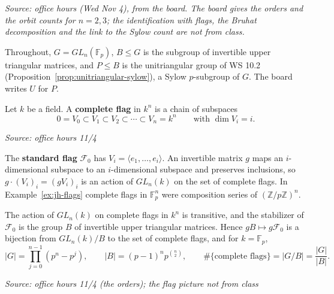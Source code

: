 \documentclass[11pt]{report}
\newcommand{\srcline}[1]{\par\hfill{\footnotesize\textit{Source: #1}}}
\begin{document}
\textit{Source: office hours (Wed Nov 4), from the board. The board gives the orders and the orbit counts for $n = 2, 3$; the identification with flags, the Bruhat decomposition and the link to the Sylow count are not from class.}

Throughout, $G = GL_n(\mathbb{F}_p)$, $B \leq G$ is the subgroup of invertible upper triangular matrices, and $P \leq B$ is the unitriangular group of WS 10.2 (Proposition~\ref{prop:unitriangular-sylow}), a Sylow $p$-subgroup of $G$. The board writes $U$ for $P$.

\begin{defbox}\label{def:complete-flag}
Let $k$ be a field. A \textbf{complete flag} in $k^n$ is a chain of subspaces
\[ 0 = V_0 \subset V_1 \subset V_2 \subset \cdots \subset V_n = k^n \qquad \text{with } \dim V_i = i. \]
\srcline{office hours 11/4}
\end{defbox}

The \textbf{standard flag} $\mathcal{F}_0$ has $V_i = \langle e_1, \ldots, e_i \rangle$. An invertible matrix $g$ maps an $i$-dimensional subspace to an $i$-dimensional subspace and preserves inclusions, so $g \cdot (V_i)_i = (gV_i)_i$ is an action of $GL_n(k)$ on the set of complete flags. In Example~\ref{ex:jh-flags} complete flags in $\mathbb{F}_p^n$ were composition series of $(\mathbb{Z}/p\mathbb{Z})^n$.

\begin{propbox}\label{prop:flags-g-mod-b}
The action of $GL_n(k)$ on complete flags in $k^n$ is transitive, and the stabilizer of $\mathcal{F}_0$ is the group $B$ of invertible upper triangular matrices. Hence $gB \mapsto g\mathcal{F}_0$ is a bijection from $GL_n(k)/B$ to the set of complete flags, and for $k = \mathbb{F}_p$,
\[ |G| = \prod_{j=0}^{n-1} (p^n - p^j), \qquad |B| = (p-1)^n p^{\binom{n}{2}}, \qquad \#\{\text{complete flags}\} = |G/B| = \frac{|G|}{|B|}. \]
\srcline{office hours 11/4 (the orders); the flag picture not from class}
\end{propbox}
\end{document}
